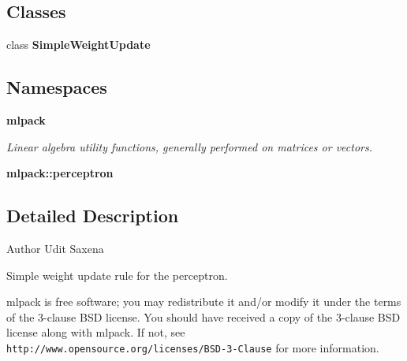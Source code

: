 \subsection*{Classes}
\begin{DoxyCompactItemize}
\item 
class \textbf{ Simple\+Weight\+Update}
\end{DoxyCompactItemize}
\subsection*{Namespaces}
\begin{DoxyCompactItemize}
\item 
 \textbf{ mlpack}
\begin{DoxyCompactList}\small\item\em Linear algebra utility functions, generally performed on matrices or vectors. \end{DoxyCompactList}\item 
 \textbf{ mlpack\+::perceptron}
\end{DoxyCompactItemize}


\subsection{Detailed Description}
\begin{DoxyAuthor}{Author}
Udit Saxena
\end{DoxyAuthor}
Simple weight update rule for the perceptron.

mlpack is free software; you may redistribute it and/or modify it under the terms of the 3-\/clause B\+SD license. You should have received a copy of the 3-\/clause B\+SD license along with mlpack. If not, see {\tt http\+://www.\+opensource.\+org/licenses/\+B\+S\+D-\/3-\/\+Clause} for more information. 